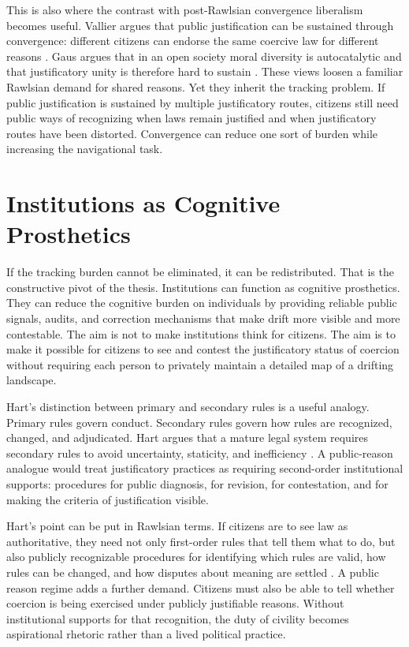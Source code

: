 \documentclass[12pt]{article}
\begin{document}
This is also where the contrast with post-Rawlsian convergence liberalism becomes useful. Vallier argues that public justification can be sustained through convergence: different citizens can endorse the same coercive law for different reasons \parencite[p.~191]{vallier2011diss}. Gaus argues that in an open society moral diversity is autocatalytic and that justificatory unity is therefore hard to sustain \parencite[p.~14]{gaus2021open}. These views loosen a familiar Rawlsian demand for shared reasons. Yet they inherit the tracking problem. If public justification is sustained by multiple justificatory routes, citizens still need public ways of recognizing when laws remain justified and when justificatory routes have been distorted. Convergence can reduce one sort of burden while increasing the navigational task.

\section{Institutions as Cognitive Prosthetics}

If the tracking burden cannot be eliminated, it can be redistributed. That is the constructive pivot of the thesis. Institutions can function as cognitive prosthetics. They can reduce the cognitive burden on individuals by providing reliable public signals, audits, and correction mechanisms that make drift more visible and more contestable. The aim is not to make institutions think for citizens. The aim is to make it possible for citizens to see and contest the justificatory status of coercion without requiring each person to privately maintain a detailed map of a drifting landscape.

Hart's distinction between primary and secondary rules is a useful analogy. Primary rules govern conduct. Secondary rules govern how rules are recognized, changed, and adjudicated. Hart argues that a mature legal system requires secondary rules to avoid uncertainty, staticity, and inefficiency \parencite[pp.~92--93]{hart2012concept}. A public-reason analogue would treat justificatory practices as requiring second-order institutional supports: procedures for public diagnosis, for revision, for contestation, and for making the criteria of justification visible.

Hart's point can be put in Rawlsian terms. If citizens are to see law as authoritative, they need not only first-order rules that tell them what to do, but also publicly recognizable procedures for identifying which rules are valid, how rules can be changed, and how disputes about meaning are settled \parencite[pp.~79--80]{hart2012concept}. A public reason regime adds a further demand. Citizens must also be able to tell whether coercion is being exercised under publicly justifiable reasons. Without institutional supports for that recognition, the duty of civility becomes aspirational rhetoric rather than a lived political practice.
\end{document}
